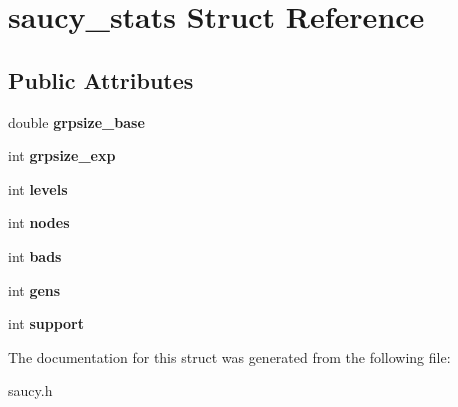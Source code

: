 \hypertarget{structsaucy__stats}{\section{saucy\-\_\-stats Struct Reference}
\label{structsaucy__stats}
}
\subsection*{Public Attributes}
\begin{DoxyCompactItemize}
\item 
\hypertarget{structsaucy__stats_a1df2b4661fe674b4f41e6b74c757c4b7}{double {\bfseries grpsize\-\_\-base}}\label{structsaucy__stats_a1df2b4661fe674b4f41e6b74c757c4b7}

\item 
\hypertarget{structsaucy__stats_a1e439c519ef94116148ebed5896cb82c}{int {\bfseries grpsize\-\_\-exp}}\label{structsaucy__stats_a1e439c519ef94116148ebed5896cb82c}

\item 
\hypertarget{structsaucy__stats_ac07b88469b78ff40586b7149ccc8da5f}{int {\bfseries levels}}\label{structsaucy__stats_ac07b88469b78ff40586b7149ccc8da5f}

\item 
\hypertarget{structsaucy__stats_a0f30ed579f785dda0ca067866ef960cc}{int {\bfseries nodes}}\label{structsaucy__stats_a0f30ed579f785dda0ca067866ef960cc}

\item 
\hypertarget{structsaucy__stats_a158aee6bf48f81cc3ad1748670f6d91f}{int {\bfseries bads}}\label{structsaucy__stats_a158aee6bf48f81cc3ad1748670f6d91f}

\item 
\hypertarget{structsaucy__stats_a1526f378811c0bb2e48ed70743d5f078}{int {\bfseries gens}}\label{structsaucy__stats_a1526f378811c0bb2e48ed70743d5f078}

\item 
\hypertarget{structsaucy__stats_a7723003bb9d8ec737413fbd46b17a2ea}{int {\bfseries support}}\label{structsaucy__stats_a7723003bb9d8ec737413fbd46b17a2ea}

\end{DoxyCompactItemize}


The documentation for this struct was generated from the following file\-:\begin{DoxyCompactItemize}
\item 
saucy.\-h\end{DoxyCompactItemize}
